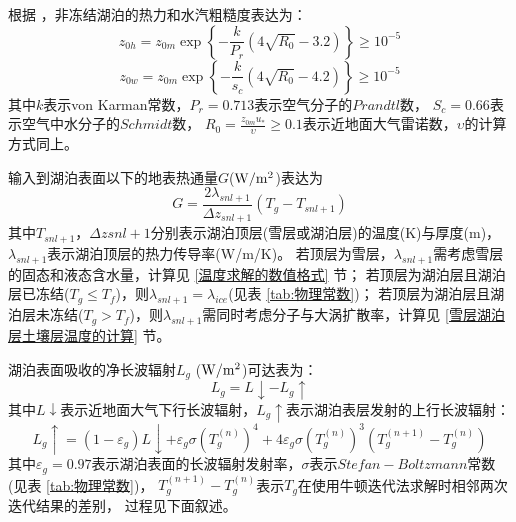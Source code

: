 根据 \citet{Zilitinkevich2001}，非冻结湖泊的热力和水汽粗糙度表达为：
\begin{equation}
z_{0 h}=z_{0 m} \exp \left\{-\frac{k}{P_{r}}\left(4 \sqrt{R_{0}}-3.2\right)\right\} \geq 10^{-5}
\end{equation}
\begin{equation}
z_{0 w}=z_{0 m} \exp \left\{-\frac{k}{s_{c}}\left(4 \sqrt{R_{0}}-4.2\right)\right\} \geq 10^{-5}
\end{equation}
其中$k$表示von Karman常数，$P_r=0.713$表示空气分子的$Prandtl$数，
$S_c=0.66$表示空气中水分子的$Schmidt$数，
$R_0=\frac{z_{0m}u_\ast}{\upsilon}\geq0.1$表示近地面大气雷诺数，$\upsilon$的计算方式同上。


输入到湖泊表面以下的地表热通量$G$($\rm W/m^2$)表达为
\begin{equation}
G=\frac{2 \lambda_{s n l+1}}{\Delta z_{s n l+1}}\left(T_{g}-T_{s n l+1}\right)
\end{equation}
其中$T_{snl+1}$，$\Delta zsnl+1$分别表示湖泊顶层(雪层或湖泊层)的温度(K)与厚度(m)，
$\lambda_{snl+1}$表示湖泊顶层的热力传导率(W/m/K)。
若顶层为雪层，$\lambda_{snl+1}$需考虑雪层的固态和液态含水量，计算见 \ref{温度求解的数值格式} 节；
若顶层为湖泊层且湖泊层已冻结($T_g\le T_f$)，则$\lambda_{snl+1}=\lambda_{ice}$(见表 \ref{tab:物理常数})；
若顶层为湖泊层且湖泊层未冻结($T_g>T_f$)，则$\lambda_{snl+1}$需同时考虑分子与大涡扩散率，计算见 \ref{雪层湖泊层土壤层温度的计算} 节。


湖泊表面吸收的净长波辐射$L_g$ ($\rm W/m^2$)可达表为：
\begin{equation}
L_{g}=L \downarrow-L_{g} \uparrow
\end{equation}
其中$L\downarrow$表示近地面大气下行长波辐射，$L_g\uparrow$表示湖泊表层发射的上行长波辐射：
\begin{equation}
L_{g} \uparrow=\left(1-\varepsilon_{g}\right) L \downarrow+\varepsilon_{g} 
\sigma\left(T_{g}^{(n)}\right)^{4}+4 \varepsilon_{g} 
\sigma\left(T_{g}^{(n)}\right)^{3}\left(T_{g}^{(n+1)}-T_{g}^{(n)}\right)
\end{equation}
其中$\varepsilon_g=0.97$表示湖泊表面的长波辐射发射率，$\sigma$表示$Stefan-Boltzmann$常数(见表 \ref{tab:物理常数})，
$T_g^{\left(n+1\right)}-T_g^{\left(n\right)}$表示$T_g$在使用牛顿迭代法求解时相邻两次迭代结果的差别，
过程见下面叙述。



